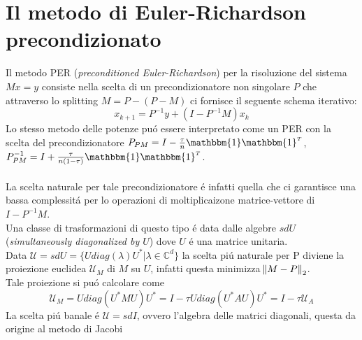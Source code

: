 \documentclass[12pt,a4paper]{amsart}
\numberwithin{equation}{section}
\theoremstyle{plain}
\theoremstyle{definition}
\newcommand{\tr}{^{\mathsmaller T}}
\newcommand{\ones}{\mathbbm{1}}
\begin{document}
\section{Il metodo di Euler-Richardson precondizionato}

Il metodo PER (\textit{preconditioned Euler-Richardson}) per la risoluzione del sistema $Mx=y$ consiste nella scelta di un precondizionatore non singolare $P$ che attraverso lo splitting $M=P-(P-M)$ ci fornisce il seguente schema iterativo:
\begin{equation}
x_{k+1}=P^{-1}y+(I-P^{-1}M)x_k 
\end{equation}
Lo stesso metodo delle potenze pu\'o essere interpretato come un PER con la scelta del precondizionatore $P_{PM}=I-\frac{\tau}{n}\ones\ones\tr$, $P_{PM}^{-1}=I+\frac{\tau}{n(1-\tau)}\ones\ones\tr$.\\
\\
La scelta naturale per tale precondizionatore \'e infatti quella che ci garantisce una bassa complessit\'a per lo operazioni di moltiplicaizone matrice-vettore  di $I-P^{-1}M$.\\
Una classe di trasformazioni di questo tipo \'e data dalle algebre $sdU$ (\textit{simultaneously diagonalized by $U$}) dove $U$ \'e una matrice unitaria.\\
Data $\mathcal{U}=sdU=\{U diag(\lambda)U^* \vert \lambda \in \mathbb{C}^d \}$ la scelta pi\'u naturale per P diviene la proiezione euclidea $\mathcal{U}_M$ di $M$ su $U$, infatti questa minimizza $\norm{M-P}_2$.\\
Tale proiezione si pu\'o calcolare come
\begin{equation}
\mathcal{U}_M=U diag(U^* M U)U^*=I-\tau U diag(U^*AU)U^*=I-\tau \mathcal{U}_A
\end{equation}
La scelta pi\'u banale \'e $\mathcal{U}=sdI$, ovvero l'algebra delle matrici diagonali, questa da origine al metodo di Jacobi
\end{document}
